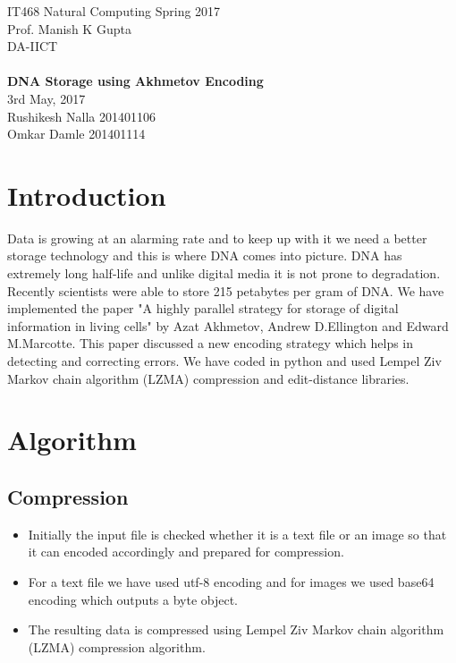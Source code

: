 \documentclass[11pt]{article}
\begin{document}

\begin{center}
{\large IT468 Natural Computing Spring 2017} \\
Prof. Manish K Gupta  \\
DA-IICT\\
\hspace{0.25in} \\
{\Large\bf DNA Storage using Akhmetov Encoding} \\
 3rd May, 2017 \\
Rushikesh Nalla 201401106 \\
Omkar Damle 201401114
\end{center}


\section{Introduction}

Data is growing at an alarming rate and to keep up with it we need a better storage technology and this is where DNA comes into picture. DNA has extremely long half-life and unlike digital media it is not prone to degradation. Recently scientists were able to store 215 petabytes per gram of DNA. We have implemented the paper "A highly parallel strategy for storage of digital information in living cells" by Azat Akhmetov, Andrew D.Ellington and Edward M.Marcotte. This paper discussed a new encoding strategy which helps in detecting and correcting errors. We have coded in python and used Lempel Ziv Markov chain algorithm (LZMA) compression and edit-distance libraries.

\section{Algorithm}

\subsection{Compression}

\begin{itemize}
    \item Initially the input file is checked whether it is a text file or an image so that it can encoded accordingly and prepared for compression.
    \item For a text file we have used utf-8 encoding and for images we used base64 encoding which outputs a byte object.
    \item The resulting data is compressed using Lempel Ziv Markov chain algorithm (LZMA) compression algorithm.
\end{itemize}
\end{document}
